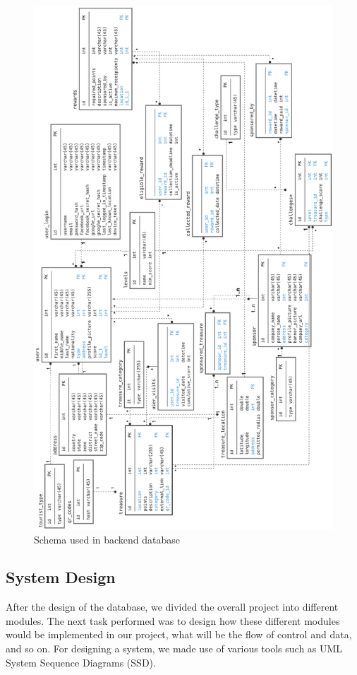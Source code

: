 \documentclass[12pt, a4paper, oneside]{article}
\begin{document}
\begin{figure}[H]
\includegraphics[height=0.8\paperheight, keepaspectratio]{db/schema.png}
\centering
\caption{Schema used in backend database}
\label{fig:db-schema}
\end{figure}

\subsection{System Design}
After the design of the database, we divided the overall project into different modules. The next task performed was to design how these different modules would be implemented in our project, what will be the flow of control and data, and so on. For designing a system, we made use of various tools such as UML System Sequence Diagrams (SSD).
\end{document}
